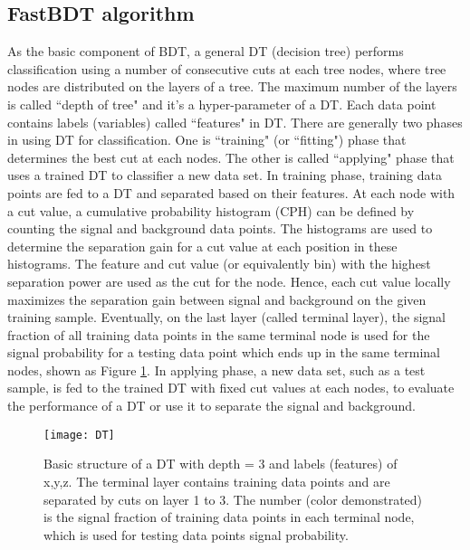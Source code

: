 \subsection{FastBDT algorithm}
As the basic component of BDT, a general DT (decision tree) performs classification using a number of consecutive cuts at each tree nodes, where tree nodes are distributed on the layers of a tree. The maximum number of the layers is called ``depth of tree" and it's a hyper-parameter of a DT. Each data point contains labels (variables) called ``features" in DT. There are generally two phases in using DT for classification. One is ``training" (or ``fitting") phase that determines the best cut at each nodes. The other is called ``applying" phase that uses a trained DT to classifier a new data set. In training phase, training data points are fed to a DT and separated based on their features. At each node with a cut value, a cumulative probability histogram (CPH) can be defined by counting the signal and background data points. The histograms are used to determine the separation gain for a cut value at each position in these histograms. The feature and cut value (or
equivalently bin) with the highest separation power are used as the cut for the node. Hence, each cut value locally maximizes the separation gain between signal and background on the given
training sample. Eventually, on the last layer (called terminal layer), the signal fraction of all training data points in the same terminal node is used for the signal probability for a testing data point which ends up in the same terminal nodes, shown as Figure \ref{fig:DT}. In applying phase, a new data set, such as a test sample, is fed to the trained DT with fixed cut values at each nodes, to evaluate the performance of a DT or use it to separate the signal and background.

\begin{figure}[htpb]
	\centering 
	\texttt{[image: DT]}
	\caption{Basic structure of a DT with depth = 3 and labels (features) of x,y,z. The terminal layer contains training data points and are separated by cuts on layer 1 to 3. The number (color demonstrated) is the signal fraction of training data points in each terminal node, which is used for testing data points signal probability.}
	\label{fig:DT}
\end{figure}

